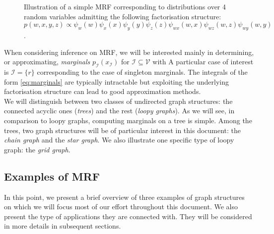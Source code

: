 \begin{figure}[!h]
\center
{}
\caption{\label{fig:simple-MRF}Illustration of a simple MRF corresponding to distributions over 4 random variables admitting the following factorisation structure:\\ $p(w,x,y,z)\propto \psi_{w}(w)\psi_{x}(x)\psi_{y}(y)\psi_{z}(z)\psi_{wx}(w,x)\psi_{wz}(w,z)\psi_{wy}(w,y)$.}
\end{figure}


When considering inference on MRF, we will be interested mainly in determining, or approximating, \emph{marginals} $p_{\mathcal I}(x_{\mathcal I})$ for $\mathcal I\subseteq\mathcal V$  with
A particular case of interest is $\mathcal I=\{r\}$ corresponding to the case of singleton marginals. The integrals of the form \eqref{eq:marginals} are typically intractable but exploiting the underlying factorisation structure can lead to good approximation methods.\\

We will distinguish between two classes of undirected graph structures: the connected acyclic ones (\emph{trees}) and the rest (\emph{loopy graphs}). As we will see, in comparison to loopy graphs, computing marginals on a tree is simple. 
Among the trees, two graph structures will be of particular interest in this document: the \emph{chain graph} and the \emph{star graph}. We also illustrate one specific type of loopy graph: the \emph{grid graph}.


\subsection{Examples of MRF}
In this point, we present a brief overview of three examples of graph structures on which we will focus most of our effort throughout this document. We also present the type of applications they are connected with. They will be considered in more details in subsequent sections.

